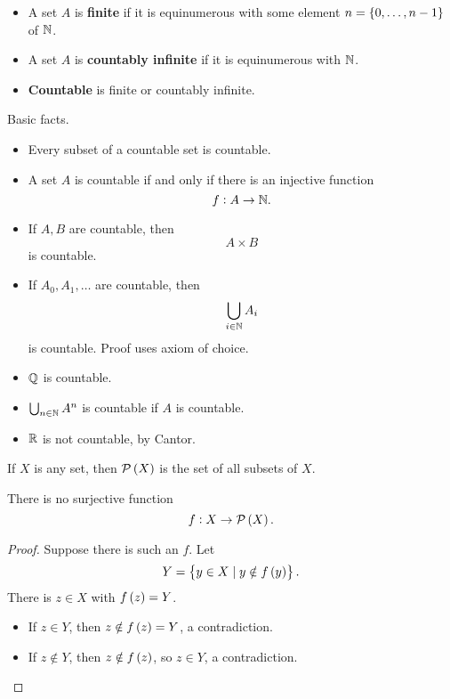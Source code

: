 \begin{definition}
\hfill
\begin{itemize}
\item A set $ A $ is \textbf{finite} if it is equinumerous with some element $ n = \cbr{0, \dots, n - 1} $ of $ \mathbb{N} $.
\item A set $ A $ is \textbf{countably infinite} if it is equinumerous with $ \mathbb{N} $.
\item \textbf{Countable} is finite or countably infinite.
\end{itemize}
\end{definition}

\pagebreak

\begin{remark}
Basic facts.
\begin{itemize}
\item Every subset of a countable set is countable.
\item A set $ A $ is countable if and only if there is an injective function
$$ f : A \to \mathbb{N}. $$
\item If $ A, B $ are countable, then
$$ A \times B $$
is countable.
\item If $ A_0, A_1, \dots $ are countable, then
$$ \bigcup_{i \in \mathbb{N}} A_i $$
is countable. Proof uses axiom of choice.
\end{itemize}
\end{remark}

\begin{example*}
\hfill
\begin{itemize}
\item $ \mathbb{Q} $ is countable.
\item $ \bigcup_{n \in \mathbb{N}} A^n $ is countable if $ A $ is countable.
\item $ \mathbb{R} $ is not countable, by Cantor.
\end{itemize}
\end{example*}

If $ X $ is any set, then $ \PP\br{X} $ is the set of all subsets of $ X $.

\begin{theorem}[Cantor]
\label{thm:3.1.4}
There is no surjective function
$$ f : X \to \PP\br{X}. $$
\end{theorem}

\begin{proof}
Suppose there is such an $ f $. Let
$$ Y = \cbr{y \in X \mid y \notin f\br{y}}. $$
There is $ z \in X $ with $ f\br{z} = Y $.
\begin{itemize}
\item If $ z \in Y $, then $ z \notin f\br{z} = Y $, a contradiction.
\item If $ z \notin Y $, then $ z \notin f\br{z} $, so $ z \in Y $, a contradiction.
\end{itemize}
\end{proof}


